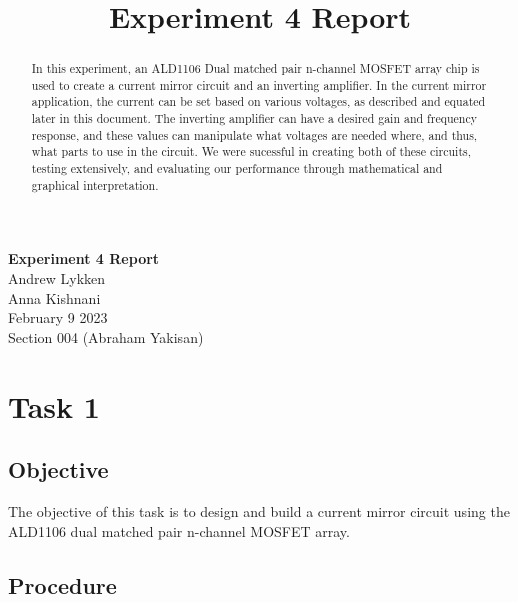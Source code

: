 \documentclass[notitlepage, 12pt]{report}  %
\title{Experiment 4 Report}
\begin{document}


\begin{center}
\large \textbf{Experiment 4 Report} \\ %
\small 
Andrew Lykken\\
Anna Kishnani\\
February 9 2023\\
Section 004 (Abraham Yakisan)\\

\end{center}

\vspace{4in}


\begin{abstract}

In this experiment, an ALD1106 Dual matched pair n-channel MOSFET array chip is used to create a current mirror circuit and 
an inverting amplifier. In the current mirror application, the current can be set based on various voltages, as described and equated 
later in this document. The inverting amplifier can have a desired gain and frequency response, and these values can manipulate what voltages 
are needed where, and thus, what parts to use in the circuit. We were sucessful in creating both of these circuits, testing extensively, and 
evaluating our performance through mathematical and graphical interpretation.

\end{abstract}

\newpage

\section*{Task 1} %


\subsection*{Objective}

\indent\indent The objective of this task is to design and build a current mirror circuit using the ALD1106 
dual matched pair n-channel MOSFET array.\\

\subsection*{Procedure}
\end{document}
